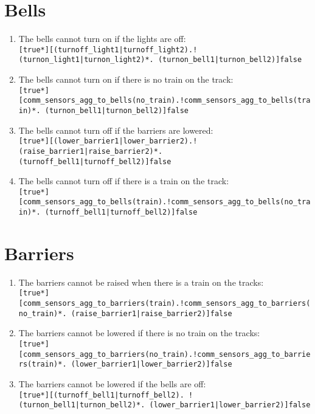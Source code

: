 \documentclass[final]{report}
\begin{document}
\section{Bells}

\begin{enumerate}
    \item The bells cannot turn on if the lights are off:\\     
        \texttt{[true*][(turnoff\_light1|turnoff\_light2).!(turnon\_light1|turnon\_light2)*. (turnon\_bell1|turnon\_bell2)]false}

    \item The bells cannot turn on if there is no train on the track:\\
        \texttt{[true*][comm\_sensors\_agg\_to\_bells(no\_train).!comm\_sensors\_agg\_to\_bells(train)*. (turnon\_bell1|turnon\_bell2)]false}

    \item The bells cannot turn off if the barriers are lowered:\\
        \texttt{[true*][(lower\_barrier1|lower\_barrier2).!(raise\_barrier1|raise\_barrier2)*. (turnoff\_bell1|turnoff\_bell2)]false}

    \item The bells cannot turn off if there is a train on the track:\\
        \texttt{[true*][comm\_sensors\_agg\_to\_bells(train).!comm\_sensors\_agg\_to\_bells(no\_train)*. (turnoff\_bell1|turnoff\_bell2)]false}
\end{enumerate}


\section{Barriers}

\begin{enumerate}
    \item The barriers cannot be raised when there is a train on the tracks:\\
        \texttt{[true*][comm\_sensors\_agg\_to\_barriers(train).!comm\_sensors\_agg\_to\_barriers(no\_train)*. (raise\_barrier1|raise\_barrier2)]false}

    \item The barriers cannot be lowered if there is no train on the tracks:\\   
        \texttt{[true*][comm\_sensors\_agg\_to\_barriers(no\_train).!comm\_sensors\_agg\_to\_barriers(train)*. (lower\_barrier1|lower\_barrier2)]false}

    \item The barriers cannot be lowered if the bells are off:\\    
        \texttt{[true*][(turnoff\_bell1|turnoff\_bell2). !(turnon\_bell1|turnon\_bell2)*. (lower\_barrier1|lower\_barrier2)]false}
        
\end{enumerate}
\end{document}
